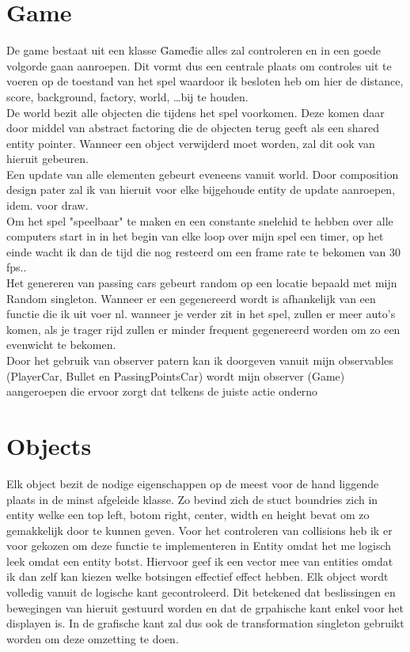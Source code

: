 \documentclass[12pt,a4paper]{article}
\begin{document}
\section{Game}
De game bestaat uit een klasse \"Game\" die alles zal controleren en in een goede volgorde gaan aanroepen. Dit vormt dus een centrale plaats om controles uit te voeren op de toestand van het spel waardoor ik besloten heb om hier de distance, score, background, factory, world, \ldots bij te houden.\\
De world bezit alle objecten die tijdens het spel voorkomen. Deze komen daar door middel van abstract factoring die de objecten terug geeft als een shared entity pointer. Wanneer een object verwijderd moet worden, zal dit ook van hieruit gebeuren.\\
Een update van alle elementen gebeurt eveneens vanuit world. Door composition design pater zal ik van hieruit voor elke bijgehoude entity de update aanroepen, idem. voor draw.\\
\linebreak
Om het spel "speelbaar" te maken en een constante snelehid te hebben over alle computers start in in het begin van elke loop over mijn spel een timer, op het einde wacht ik dan de tijd die nog resteerd om een frame rate te bekomen van 30 fps..\\
Het genereren van passing cars gebeurt random op een locatie bepaald met mijn Random singleton. Wanneer er een gegenereerd wordt is afhankelijk van een functie die ik uit voer nl. wanneer je verder zit in het spel, zullen er meer auto's komen, als je trager rijd zullen er minder frequent gegenereerd worden om zo een evenwicht te bekomen.\\
\linebreak
Door het gebruik van observer patern kan ik doorgeven vanuit mijn observables (PlayerCar, Bullet en PassingPointsCar) wordt mijn observer (Game) aangeroepen die ervoor zorgt dat telkens de juiste actie onderno

\section{Objects}
Elk object bezit de nodige eigenschappen op de meest voor de hand liggende plaats in de minst afgeleide klasse. Zo bevind zich de stuct boundries zich in entity welke een top left, botom right, center, width en height bevat om zo gemakkelijk door te kunnen geven. Voor het controleren van collisions heb ik er voor gekozen om deze functie te implementeren in Entity omdat het me logisch leek omdat een entity botst. Hiervoor geef ik een vector mee van entities omdat ik dan zelf kan kiezen welke botsingen effectief effect hebben.
\newpage
Elk object wordt volledig vanuit de logische kant gecontroleerd. Dit betekened dat beslissingen en bewegingen van hieruit gestuurd worden en dat de grpahische kant enkel voor het displayen is. In de grafische kant zal dus ook de transformation singleton gebruikt worden om deze omzetting te doen.
\end{document}
